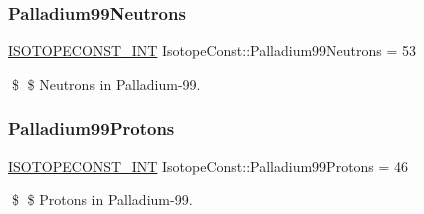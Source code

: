 \subsubsection{\texorpdfstring{Palladium99\+Neutrons}{Palladium99Neutrons}}
{\footnotesize\ttfamily \mbox{\hyperlink{group___isotope_const-_macros_ga5f18360b3e99483a35c32d789e62621c}{I\+S\+O\+T\+O\+P\+E\+C\+O\+N\+S\+T\+\_\+\+I\+NT}} Isotope\+Const\+::\+Palladium99\+Neutrons = 53}

\$ \$ Neutrons in Palladium-\/99. \mbox{\label{group___isotope_const-_palladium-_pd99_ga5039e00995a465c58344c27203d350c3}} 
\subsubsection{\texorpdfstring{Palladium99\+Protons}{Palladium99Protons}}
{\footnotesize\ttfamily \mbox{\hyperlink{group___isotope_const-_macros_ga5f18360b3e99483a35c32d789e62621c}{I\+S\+O\+T\+O\+P\+E\+C\+O\+N\+S\+T\+\_\+\+I\+NT}} Isotope\+Const\+::\+Palladium99\+Protons = 46}

\$ \$ Protons in Palladium-\/99. 